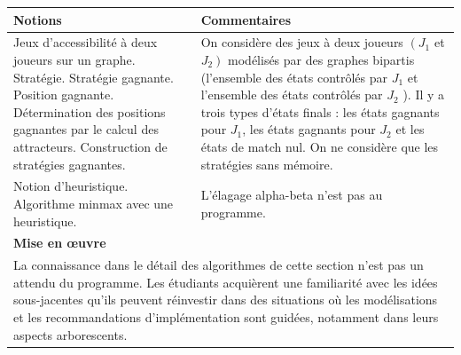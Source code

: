 \begin{tabularx}{\textwidth}[t]{|X|X|}
  \hline 
  \textbf{Notions} & \textbf{Commentaires} \\
  \hline 
  Jeux d'accessibilité à deux joueurs sur un graphe. Stratégie. Stratégie gagnante. Position gagnante. Détermination des positions gagnantes par le calcul des attracteurs. Construction de stratégies gagnantes.
   & 
   On considère des jeux à deux joueurs $\left(J_1\right.$ et $\left.J_2\right)$ modélisés par des graphes bipartis (l'ensemble des états contrôlés par $J_1$ et l'ensemble des états contrôlés par $J_2$ ). Il y a trois types d'états finals : les états gagnants pour $J_1$, les états gagnants pour $J_2$ et les états de match nul.
On ne considère que les stratégies sans mémoire.
  \\
  \hline 
  Notion d'heuristique. Algorithme minmax avec une heuristique.
   & 
   L'élagage alpha-beta n'est pas au programme.
  \\
  \hline 
  \multicolumn{2}{|X|}{\textbf{Mise en œuvre}}
  \\
  \hline 
  \multicolumn{2}{|p{0.95\textwidth}|}{
  La connaissance dans le détail des algorithmes de cette section n'est pas un attendu du programme. Les étudiants acquièrent une familiarité avec les idées sous-jacentes qu'ils peuvent réinvestir dans des situations où les modélisations et les recommandations d'implémentation sont guidées, notamment dans leurs aspects arborescents.
  } 
  \\
  \hline
\end{tabularx}
